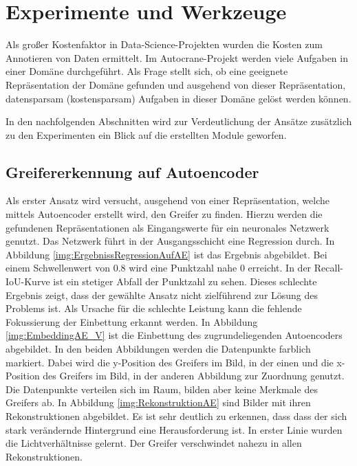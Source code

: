 \chapter{Experimente und Werkzeuge}
\label{chap:HauptteilMultiTaskLernen}
Als großer Kostenfaktor in Data-Science-Projekten wurden die Kosten zum Annotieren von Daten ermittelt. Im Autocrane-Projekt werden viele Aufgaben in einer Domäne durchgeführt. Als Frage stellt sich, ob eine geeignete Repräsentation der Domäne gefunden und ausgehend von dieser Repräsentation, datensparsam (kostensparsam) Aufgaben in dieser Domäne gelöst werden können.  

In den nachfolgenden Abschnitten wird zur Verdeutlichung der Ansätze zusätzlich zu den Experimenten ein Blick auf die erstellten Module geworfen.

	\section{Greifererkennung auf Autoencoder}
	\label{sec:GreifererkennungAufAutoencoder}
	Als erster Ansatz wird versucht, ausgehend von einer Repräsentation, welche mittels Autoencoder erstellt wird, den Greifer zu finden. Hierzu werden die gefundenen Repräsentationen als Eingangswerte für ein neuronales Netzwerk genutzt. Das Netzwerk führt in der Ausgangsschicht eine Regression durch. In Abbildung \ref{img:ErgebnissRegressionAufAE} ist das Ergebnis abgebildet. Bei einem Schwellenwert von 0.8 wird eine Punktzahl nahe 0 erreicht. In der Recall-IoU-Kurve ist ein stetiger Abfall der Punktzahl zu sehen. Dieses schlechte Ergebnis zeigt, dass der gewählte Ansatz nicht zielführend zur Lösung des Problems ist. Als Ursache für die schlechte Leistung kann die fehlende Fokussierung der Einbettung erkannt werden. In Abbildung \ref{img:EmbeddingAE_V} ist die Einbettung des zugrundeliegenden Autoencoders abgebildet. In den beiden Abbildungen werden die Datenpunkte farblich markiert. Dabei wird die y-Position des Greifers im Bild, in der einen und die x-Position des Greifers im Bild, in der anderen Abbildung zur Zuordnung genutzt. Die Datenpunkte verteilen sich im Raum, bilden aber keine Merkmale des Greifers ab. In Abbildung \ref{img:RekonstruktionAE} sind Bilder mit ihren Rekonstruktionen abgebildet. Es ist sehr deutlich zu erkennen, dass dass der sich stark verändernde Hintergrund eine Herausforderung ist. In erster Linie wurden die Lichtverhältnisse gelernt. Der Greifer verschwindet nahezu in allen Rekonstruktionen.   
    
